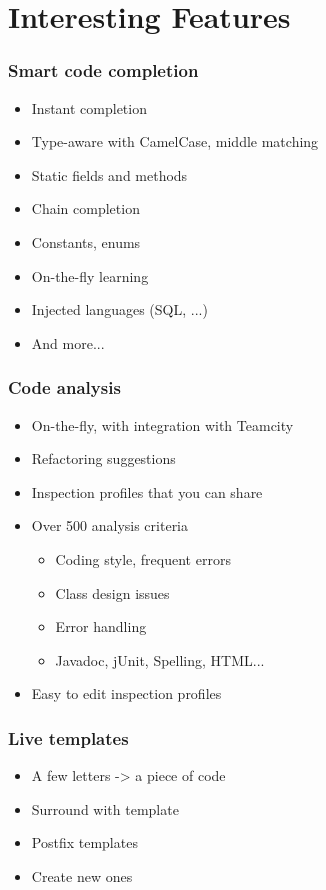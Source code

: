 \section{Interesting Features}

\begin{frame}
\frametitle{Smart code completion}
  \begin{itemize}
    \item Instant completion
    \item Type-aware with CamelCase, middle matching
    \item Static fields and methods
    \item Chain completion
    \item Constants, enums
    \item On-the-fly learning
    \item Injected languages (SQL, ...)
    \item And more...
  \end{itemize}
\end{frame}


\begin{frame}
  \frametitle{Code analysis}
  \begin{itemize}
    \item On-the-fly, with integration with Teamcity
    \item Refactoring suggestions
    \item Inspection profiles that you can share
    \item Over 500 analysis criteria
      \begin{itemize}
        \item Coding style, frequent errors
        \item Class design issues
        \item Error handling
        \item Javadoc, jUnit, Spelling, HTML...
      \end{itemize}
    \item Easy to edit inspection profiles
  \end{itemize}
\end{frame}


\begin{frame}
  \frametitle{Live templates}
  \begin{itemize}
    \item A few letters -> a piece of code
    \item Surround with template
    \item Postfix templates
    \item Create new ones
  \end{itemize}
\end{frame}

